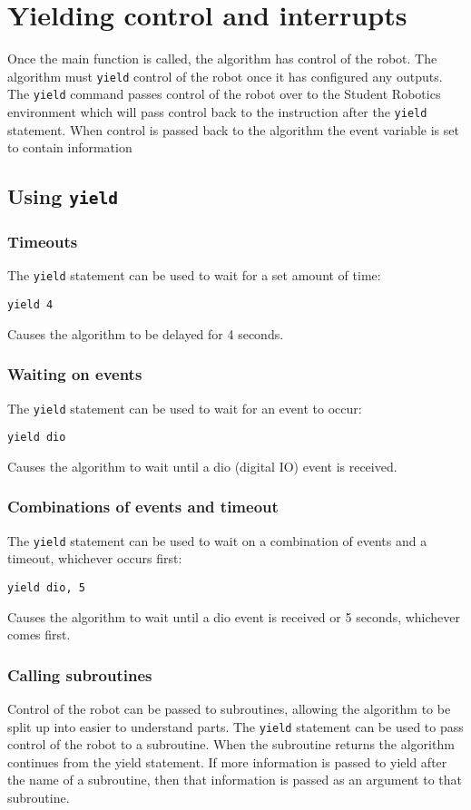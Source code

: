 \documentclass{article}
\begin{document}
\section{Yielding control and interrupts}
Once the main function is called, the algorithm has control of the robot.  The
algorithm must \texttt{yield} control of the robot once it has configured any
outputs.  The \texttt{yield} command passes control of the robot over to the
Student Robotics environment which will pass control back to the instruction
after the \texttt{yield} statement.  When control is passed back to the
algorithm the event variable is set to contain information 
\subsection{Using \texttt{yield}}
\subsubsection{Timeouts}
The \texttt{yield} statement can be used to wait for a set amount of time:

\texttt{yield 4}

Causes the algorithm to be delayed for 4 seconds.
\subsubsection{Waiting on events}
The \texttt{yield} statement can be used to wait for an event to occur:

\texttt{yield dio}

Causes the algorithm to wait until a dio (digital IO) event is received.
\subsubsection{Combinations of events and timeout}
The \texttt{yield} statement can be used to wait on a combination of events and
a timeout, whichever occurs first:

\texttt{yield dio, 5}

Causes the algorithm to wait until a dio event is received or 5 seconds,
whichever comes first.
\subsubsection{Calling subroutines}
Control of the robot can be passed to subroutines, allowing the algorithm to be
split up into easier to understand parts.  The \texttt{yield} statement can be
used to pass control of the robot to a subroutine.  When the subroutine returns
the algorithm continues from the yield statement.  If more information is
passed to yield after the name of a subroutine, then that information is passed
as an argument to that subroutine.
\end{document}
